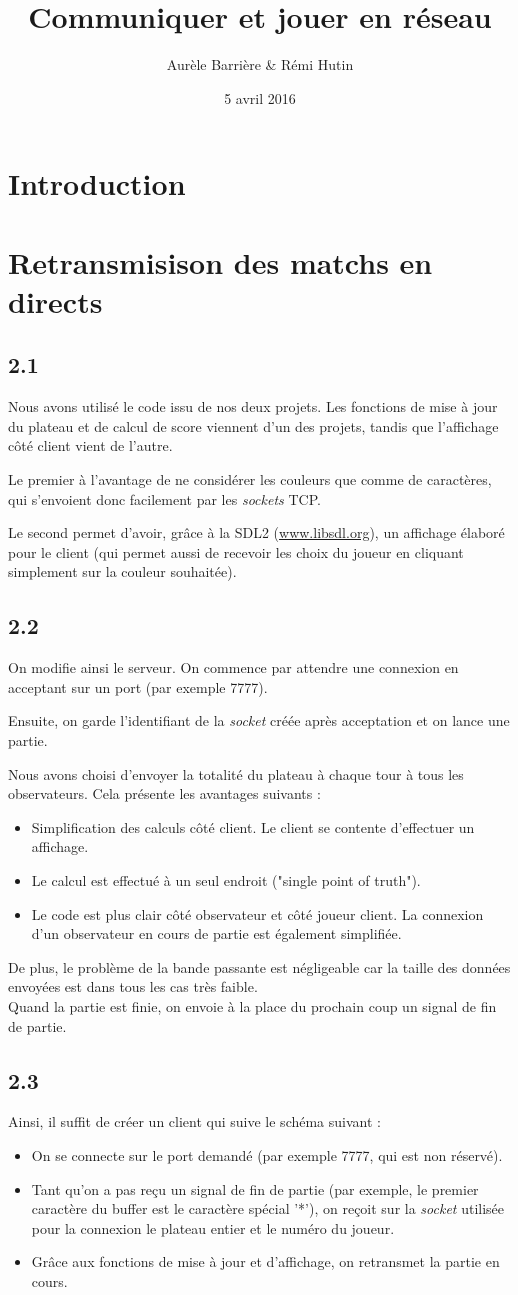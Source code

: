 \documentclass[12pt]{article}
\title{Communiquer et jouer en réseau}
\author{Aurèle Barrière \& Rémi Hutin}
\date{5 avril 2016}
\def\question#1{\subsection{#1}}
\def\sec#1{\section{#1}}
\begin{document}
\maketitle
\tableofcontents

\sec{Introduction}


\sec{Retransmisison des matchs en directs}
\question{2.1}
Nous avons utilisé le code issu de nos deux projets. Les fonctions de mise à jour du plateau et de calcul de score viennent d'un des projets, tandis que l'affichage côté client vient de l'autre.

Le premier à l'avantage de ne considérer les couleurs que comme de caractères, qui s'envoient donc facilement par les \textit{sockets} TCP.

Le second permet d'avoir, grâce à la SDL2 (\url{www.libsdl.org}), un affichage élaboré pour le client (qui permet aussi de recevoir les choix du joueur en cliquant simplement sur la couleur souhaitée).




\question{2.2}
On modifie ainsi le serveur. On commence par attendre une connexion en acceptant sur un port (par exemple 7777).

Ensuite, on garde l'identifiant de la \textit{socket} créée après acceptation et on lance une partie.

Nous avons choisi d'envoyer la totalité du plateau à chaque tour à tous les observateurs. Cela présente les avantages suivants :
\begin{itemize}
\item Simplification des calculs côté client. Le client se contente d'effectuer un affichage.
\item Le calcul est effectué à un seul endroit ("single point of truth").
\item Le code est plus clair côté observateur et côté joueur client. La connexion d'un observateur en cours de partie est également simplifiée.
\end{itemize}
De plus, le problème de la bande passante est négligeable car la taille des données envoyées est dans tous les cas très faible. \\

Quand la partie est finie, on envoie à la place du prochain coup un signal de fin de partie.


\question{2.3}
Ainsi, il suffit de créer un client qui suive le schéma suivant :
\begin{itemize}
\item On se connecte sur le port demandé (par exemple 7777, qui est non réservé).
\item Tant qu'on a pas reçu un signal de fin de partie (par exemple, le premier caractère du buffer est le caractère spécial '*'), on reçoit sur la \textit{socket} utilisée pour la connexion le plateau entier et le numéro du joueur.
\item Grâce aux fonctions de mise à jour et d'affichage, on retransmet la partie en cours.
\end{itemize}
\end{document}
